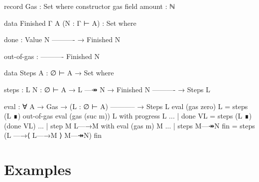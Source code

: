 \begin{fence}
\begin{code}
record Gas : Set where
  constructor gas
  field
    amount : ℕ

data Finished {Γ A} (N : Γ ⊢ A) : Set where

   done :
       Value N
       ----------
     → Finished N

   out-of-gas :
       ----------
       Finished N

data Steps {A} : ∅ ⊢ A → Set where

  steps : {L N : ∅ ⊢ A}
    → L —↠ N
    → Finished N
      ----------
    → Steps L

eval : ∀ {A}
  → Gas
  → (L : ∅ ⊢ A)
    -----------
  → Steps L
eval (gas zero)    L                     =  steps (L ∎) out-of-gas
eval (gas (suc m)) L with progress L
... | done VL                            =  steps (L ∎) (done VL)
... | step {M} L—→M with eval (gas m) M
...    | steps M—↠N fin                  =  steps (L —→⟨ L—→M ⟩ M—↠N) fin
\end{code}
\end{fence}

\hypertarget{examples}{%
\section{Examples}\label{examples}}

